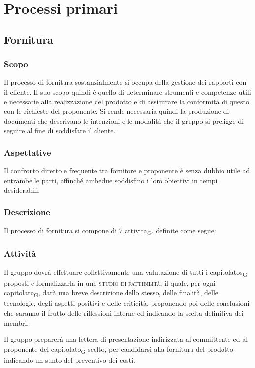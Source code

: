 \section{Processi primari}
\subsection{Fornitura}
    \subsubsection{Scopo}
        Il processo di fornitura sostanzialmente si occupa della gestione dei rapporti con il cliente.
        Il suo scopo quindi è quello di determinare strumenti e competenze utili e necessarie alla realizzazione del prodotto e di assicurare la conformità di questo con le richieste del proponente. Si rende necessaria quindi la produzione di documenti che descrivano le intenzioni e le modalità che il gruppo si prefigge di seguire al fine di soddisfare il cliente.
    \subsubsection{Aspettative}
        Il confronto diretto e frequente tra fornitore e proponente è senza dubbio utile ad entrambe le parti, affinché ambedue soddisfino i loro obiettivi in tempi desiderabili.
    \subsubsection{Descrizione}
        Il processo di fornitura si compone  di 7 \gls{attivita}\textsubscript{G}, definite come segue:
    \subsubsection{Attività}
            Il gruppo dovrà effettuare collettivamente una valutazione di tutti i \glspl{capitolato}\textsubscript{G} proposti e formalizzarla in uno \textsc{studio di fattibilità}, il quale, per ogni \gls{capitolato}\textsubscript{G}, darà una breve descrizione dello stesso, delle finalità, delle tecnologie, degli aspetti positivi e delle criticità, proponendo poi delle conclusioni che saranno il frutto delle riflessioni interne ed indicando la scelta definitiva dei membri.

            Il gruppo preparerà una lettera di presentazione indirizzata al committente ed al proponente del \gls{capitolato}\textsubscript{G} scelto, per candidarsi alla fornitura del prodotto indicando un sunto del preventivo dei costi.


